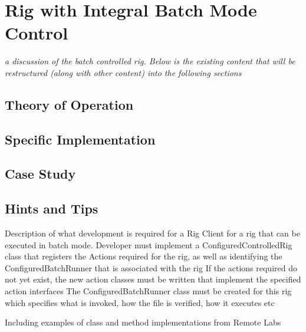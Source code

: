 \chapter{Rig with Integral Batch Mode Control}

{\em a discussion of the batch controlled rig.  Below is the existing content that will be restructured (along with other content) into the following sections}



\section{Theory of Operation}

\section{Specific Implementation}

\section{Case Study}

\section{Hints and Tips}

Description of what development is required for a Rig Client for a rig that can be executed in batch mode. 
Developer must implement a ConfiguredControlledRig class that registers the Actions required for the rig, as well as identifying the ConfiguredBatchRunner that is associated with the rig
If the actions required do not yet exist, the new action classes must be written that implement the specified action interfaces
The ConfiguredBatchRunner class must be created for this rig which specifies what is invoked, how the file is verified, how it executes etc

 Including examples of class and method implementations from Remote Labs
